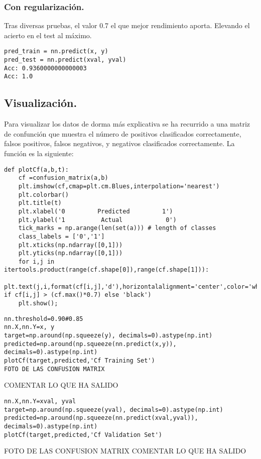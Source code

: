 \documentclass[a4paper,10pt]{article}
\begin{document}
\subsubsection{Con regularización.}
Tras diversas pruebas, el valor 0.7 el que mejor rendimiento aporta. Elevando el acierto en el test al máximo.
\begin{lstlisting}
pred_train = nn.predict(x, y)
pred_test = nn.predict(xval, yval)
Acc: 0.9360000000000003
Acc: 1.0
\end{lstlisting}
\subsection{Visualización.}
Para visualizar los datos de dorma más explicativa se ha recurrido a una matriz de confunción que muestra el número de positivos clasificados correctamente, falsos positivos, falsos negativos, y  negativos clasificados correctamente. La función es la siguiente:
\begin{lstlisting}
def plotCf(a,b,t):
    cf =confusion_matrix(a,b)
    plt.imshow(cf,cmap=plt.cm.Blues,interpolation='nearest')
    plt.colorbar()
    plt.title(t)
    plt.xlabel('0         Predicted         1')
    plt.ylabel('1          Actual            0')
    tick_marks = np.arange(len(set(a))) # length of classes
    class_labels = ['0','1']
    plt.xticks(np.ndarray([0,1]))
    plt.yticks(np.ndarray([0,1]))
    for i,j in itertools.product(range(cf.shape[0]),range(cf.shape[1])):
        plt.text(j,i,format(cf[i,j],'d'),horizontalalignment='center',color='white' if cf[i,j] > (cf.max()*0.7) else 'black')
    plt.show();
\end{lstlisting}
\begin{lstlisting}
nn.threshold=0.90#0.85
nn.X,nn.Y=x, y 
target=np.around(np.squeeze(y), decimals=0).astype(np.int)
predicted=np.around(np.squeeze(nn.predict(x,y)), decimals=0).astype(np.int)
plotCf(target,predicted,'Cf Training Set')
FOTO DE LAS CONFUSION MATRIX
\end{lstlisting}
COMENTAR LO QUE HA SALIDO
\begin{lstlisting}
nn.X,nn.Y=xval, yval 
target=np.around(np.squeeze(yval), decimals=0).astype(np.int)
predicted=np.around(np.squeeze(nn.predict(xval,yval)), decimals=0).astype(np.int)
plotCf(target,predicted,'Cf Validation Set')
\end{lstlisting}
FOTO DE LAS CONFUSION MATRIX
COMENTAR LO QUE HA SALIDO
\end{document}
